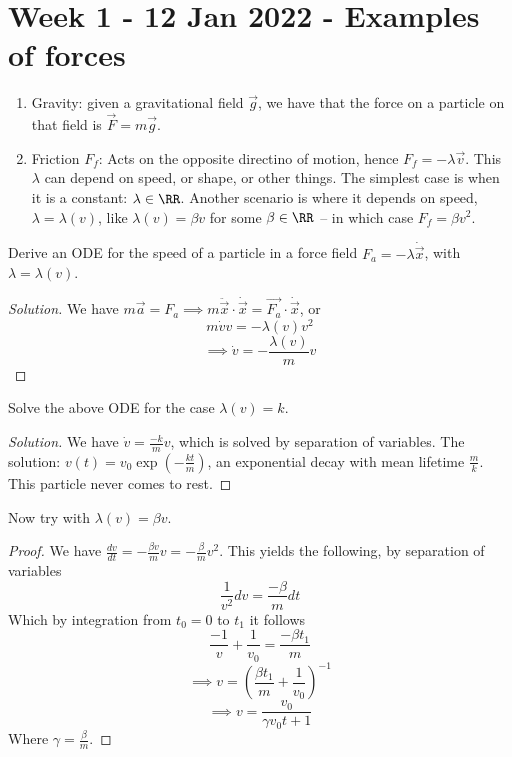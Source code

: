 \section{Week 1 - 12 Jan 2022 - Examples of forces}
\begin{example}
  \begin{enumerate}
    \item Gravity: given a gravitational field $\vec{g}$, we have that the force
      on a particle on that field is $\vec{F}=m\vec{g}$.
    \item Friction $F_f$: Acts on the opposite directino of motion, hence $F_f=
      -\lambda\vec{v}$. This $\lambda$ can depend on speed, or shape, or other
      things. The simplest case is when it is a constant: $\lambda\in\RR$.
      Another scenario is where it depends on speed, $\lambda=\lambda(v)$, like
      $\lambda(v)=\beta v$ for some $\beta\in\RR$ -- in which case $F_f=\beta v^2$.
  \end{enumerate}
  
\end{example}

\begin{example}
  Derive an ODE for the speed of a particle in a force field $F_{a}
  =-\lambda\dot{\vec{x}}$, with $\lambda=\lambda(v)$.
\end{example}
\begin{proof}[Solution]
  We have $m\vec{a}=F_a \implies m\ddot{\vec{x}}\cdot\dot{\vec{x}} =
  \vec{F_a}\cdot\dot{\vec{x}}$, or 
  \[m\dot{v}v = -\lambda(v)v^2\]
  \[\implies \dot{v}= -\frac{\lambda(v)}{m} v\]
\end{proof}
\begin{example}
  Solve the above ODE for the case $\lambda(v)=k$.
\end{example}
\begin{proof}[Solution]
  We have $\dot{v}= \frac{-k}{m} v$, which is solved by separation of variables.
  The solution: $v(t)=v_0\exp\left( -\frac{kt}{m} \right)$, an exponential decay
  with mean lifetime $\frac{m}{k}$. This particle never comes to rest.
\end{proof}

\begin{example}
  Now try with $\lambda(v)=\beta v$.
\end{example}
\begin{proof}
  We have $\frac{dv}{dt} = -\frac{\beta v}{m}v = -\frac{\beta}{m}v^2$. This
  yields the following, by separation of variables
  \[\frac{1}{v^2} dv = \frac{-\beta}{m}dt\]
  Which by integration from $t_0=0$ to $t_1$ it follows 
  \[\frac{-1}{v} + \frac{1}{v_0} = \frac{-\beta t_1}{m}\]
  \[\implies v = \left( \frac{\beta t_1}{m} +\frac{1}{v_0}
  \right)^{-1}\]
  \[\implies v= \frac{v_0}{\gamma v_0 t + 1}\]
  Where $\gamma = \frac{\beta}{m}$.
\end{proof}

